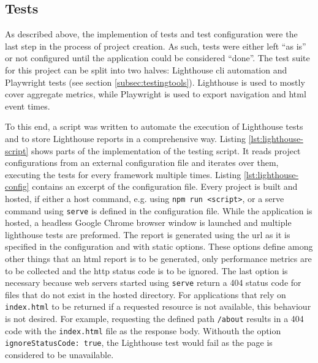 \documentclass[a4paper, 10pt]{article}
\begin{document}
\subsection{Tests}\label{subsec:tests}
% 

As described above, the implemention of tests and test configuration were the last step in the process of project creation.
As such, tests were either left \enquote{as is} or not configured until the application could be considered \enquote{done}.
The test suite for this project can be split into two halves: Lighthouse \acrshort{cli} automation and Playwright tests (see section \ref{subsec:testingtools}).
Lighthouse is used to mostly cover aggregate metrics, while Playwright is used to export navigation and \acrshort{html} event times.

To this end, a script was written to automate the execution of Lighthouse tests and to store Lighthouse reports in a comprehensive way.
Listing \ref{lst:lighthouse-script} shows parts of the implementation of the testing script.
It reads project configurations from an external configuration file and iterates over them, executing the tests for every framework multiple times.
Listing \ref{lst:lighthouse-config} contains an excerpt of the configuration file.
Every project is built and hosted, if either a host command, e.g. using \verb|npm run <script>|, or a serve command using \verb|serve| is defined in the configuration file.
While the application is hosted, a headless Google Chrome browser window is launched and multiple lighthouse tests are preformed.
The report is generated using the \acrshort{url} as it is specified in the configuration and with static options.
These options define among other things that an \acrshort{html} report is to be generated, only performance metrics are to be collected and the \acrshort{http} status code is to be ignored.
The last option is necessary because web servers started using \verb|serve| return a 404 status code for files that do not exist in the hosted directory.
For applications that rely on \verb|index.html| to be returned if a requested resource is not available, this behaviour is not desired.
For example, requesting the defined path \verb|/about| results in a 404 code with the \verb|index.html| file as the response body.
Withouth the option \verb|ignoreStatusCode: true|, the Lighthouse test would fail as the page is considered to be unavailable.
\end{document}
